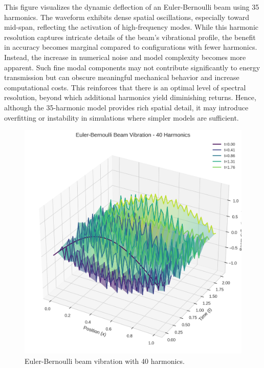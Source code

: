 \documentclass[preprint,12pt]{elsarticle}
\begin{document}
This figure visualizes the dynamic deflection of an Euler-Bernoulli beam using 35 harmonics. The waveform exhibits dense spatial oscillations, especially toward mid-span, reflecting the activation of high-frequency modes. While this harmonic resolution captures intricate details of the beam’s vibrational profile, the benefit in accuracy becomes marginal compared to configurations with fewer harmonics. Instead, the increase in numerical noise and model complexity becomes more apparent. Such fine modal components may not contribute significantly to energy transmission but can obscure meaningful mechanical behavior and increase computational costs. This reinforces that there is an optimal level of spectral resolution, beyond which additional harmonics yield diminishing returns. Hence, although the 35-harmonic model provides rich spatial detail, it may introduce overfitting or instability in simulations where simpler models are sufficient.

\begin{figure}[t]
    \centering
    \includegraphics[width=0.9\linewidth]{figures/euler_bernoulli_3d_40h.png}
    \caption{Euler-Bernoulli beam vibration with 40 harmonics.}
    \label{fig:euler_40h}
\end{figure}
\end{document}

